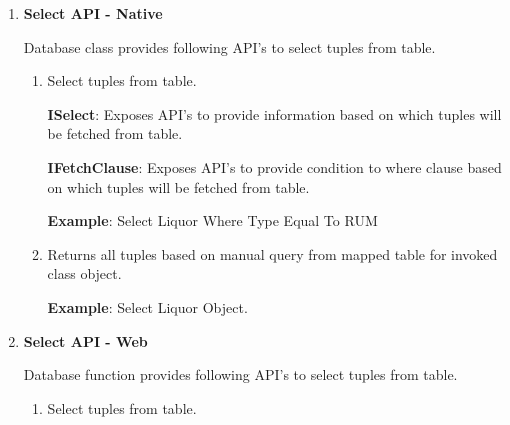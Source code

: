 		\begin{enumerate}

			\item \small \textbf{Select API - Native}
				\par
				Database class provides following API's to select tuples from table.

				\begin{enumerate}

					\item \small 

						\par
						Select tuples from table.

						\textbf{ISelect}: Exposes API's to provide information based on which tuples will be fetched from table.
						
	
				
						\textbf{IFetchClause}: Exposes API's to provide condition to where clause based on which tuples will be fetched from table.
						

						\textbf{Example}: Select Liquor Where Type Equal To RUM
						

					\item \small 

						\par
						Returns all tuples based on manual query from mapped table for invoked class object.

						\textbf{Example}: Select Liquor Object.
						


		\end{enumerate}
				

			\item \small \textbf{Select API - Web}
				\par
				Database function provides following API's to select tuples from table.

				\begin{enumerate}

					\item \small 

						\par
						Select tuples from table.


\end{enumerate}
\end{enumerate}
